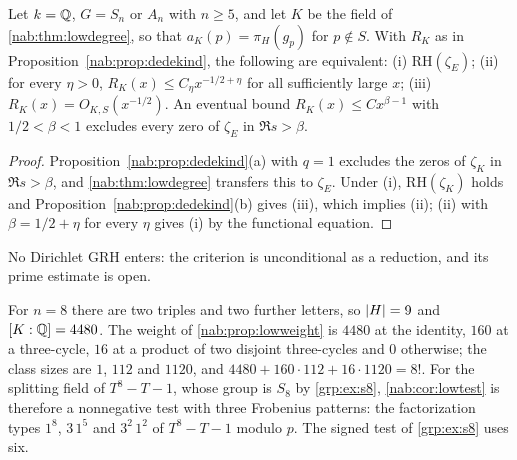 \begin{corollary}\label{nab:cor:lowtest}
Let $k=\mathbb{Q}$, $G=S_n$ or $A_n$ with $n\ge5$, and let $K$ be the field of
\cref{nab:thm:lowdegree}, so that $a_K(p)=\pi_H(g_p)$ for $p\notin S$. With $R_K$ as in
Proposition~\ref{nab:prop:dedekind}, the following are equivalent: \textup{(i)}
$\mathrm{RH}(\zeta_E)$; \textup{(ii)} for every $\eta>0$, $R_K(x)\le C_\eta x^{-1/2+\eta}$ for all
sufficiently large $x$; \textup{(iii)} $R_K(x)=O_{K,S}(x^{-1/2})$. An eventual bound
$R_K(x)\le Cx^{\beta-1}$ with $1/2<\beta<1$ excludes every zero of $\zeta_E$ in $\Re s>\beta$.
\end{corollary}
\begin{proof}
Proposition~\ref{nab:prop:dedekind}(a) with $q=1$ excludes the zeros of $\zeta_K$ in
$\Re s>\beta$, and \cref{nab:thm:lowdegree} transfers this to $\zeta_E$. Under (i),
$\mathrm{RH}(\zeta_K)$ holds and Proposition~\ref{nab:prop:dedekind}(b) gives (iii), which implies
(ii); (ii) with $\beta=1/2+\eta$ for every $\eta$ gives (i) by the functional equation.
\end{proof}

No Dirichlet GRH enters: the criterion is unconditional as a reduction, and its prime
estimate is open.

\begin{example}\label{nab:ex:lowdeg8}
For $n=8$ there are two triples and two further letters, so $\lvert H\rvert=9$ and $[K:\mathbb{Q}]=4480$.
The weight of \cref{nab:prop:lowweight} is $4480$ at the identity, $160$ at a three-cycle,
$16$ at a product of two disjoint three-cycles and $0$ otherwise; the class sizes are $1$,
$112$ and $1120$, and $4480+160\cdot112+16\cdot1120=8!$. For the splitting field of
$T^8-T-1$, whose group is $S_8$ by \cref{grp:ex:s8}, \cref{nab:cor:lowtest} is therefore a
nonnegative test with three Frobenius patterns: the factorization types $1^8$, $3\,1^5$ and
$3^2\,1^2$ of $T^8-T-1$ modulo $p$. The signed test of \cref{grp:ex:s8} uses six.
\end{example}

